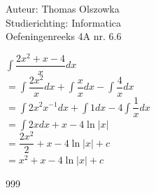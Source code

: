 \documentclass[a4paper]{article}
\newcommand{\dint}{\displaystyle\int}
\begin{document}
\noindent \large Auteur: Thomas Olszowka \\
\noindent \large Studierichting: Informatica \\
\noindent \large Oefeningenreeks 4A nr. 6.6  \\



\medskip

\normalsize

$\dint \dfrac{2x^2 + x - 4}{x} dx$ \\

$= \dint \dfrac{2x^2}{x} dx + \dint \dfrac{x}{x} dx - \dint \dfrac{4}{x} dx$ \\

$= \dint 2x^2x^{-1} dx + \dint 1 dx - 4 \dint \dfrac{1}{x} dx$\\

$= \dint 2x dx + x - 4 \ln |x|$ \\

$= \dfrac{2x^2}{2} + x - 4\ln |x| +c$ \\

$= x^2 + x - 4 \ln |x| +c$ \\


\begin{thebibliography}{999}
\end{thebibliography}
\end{document}
